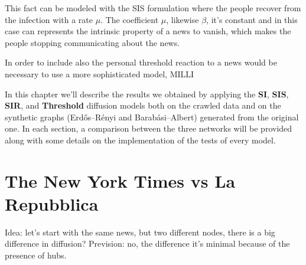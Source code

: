 This fact can be modeled with the SIS formulation where the people recover from the infection with a rate $\mu$.
The coefficient $\mu$, likewise $\beta$, it's constant and in this case can represents the intrinsic property of a news to vanish,
which makes the people stopping communicating about the news.




In order to include also the personal threshold reaction to a news would be necessary to use a more sophisticated model, MILLI

In this chapter we'll describe the results we obtained by applying the \textbf{SI}, \textbf{SIS}, \textbf{SIR},
and \textbf{Threshold} diffusion models both on the crawled data and on the synthetic graphs (Erdős–Rényi and
Barabási–Albert) generated from the original one. In each section, a comparison between the three networks will be
provided along with some details on the implementation of the tests of every model.


\section{The New York Times vs La Repubblica }

Idea: let's start with the same news, but two different nodes, there is a big difference in diffusion?
Prevision: no, the difference it's minimal because of the presence of hubs.








